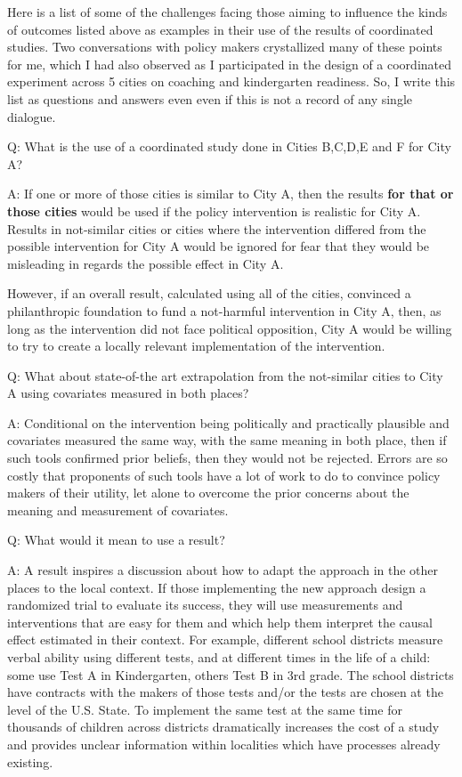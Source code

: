 \documentclass[
  11pt,
]{article}
\begin{document}
Here is a list of some of the challenges facing those aiming to
influence the kinds of outcomes listed above as examples in their use of
the results of coordinated studies. Two conversations with policy makers
crystallized many of these points for me, which I had also observed as I
participated in the design of a coordinated experiment across 5 cities
on coaching and kindergarten readiness. So, I write this list as
questions and answers even even if this is not a record of any single
dialogue.

Q: What is the use of a coordinated study done in Cities B,C,D,E and F
for City A?

A: If one or more of those cities is similar to City A, then the results
\textbf{for that or those cities} would be used if the policy
intervention is realistic for City A. Results in not-similar cities or
cities where the intervention differed from the possible intervention
for City A would be ignored for fear that they would be misleading in
regards the possible effect in City A.

However, if an overall result, calculated using all of the cities,
convinced a philanthropic foundation to fund a not-harmful intervention
in City A, then, as long as the intervention did not face political
opposition, City A would be willing to try to create a locally relevant
implementation of the intervention.

Q: What about state-of-the art extrapolation from the not-similar cities
to City A using covariates measured in both places?

A: Conditional on the intervention being politically and practically
plausible and covariates measured the same way, with the same meaning in
both place, then if such tools confirmed prior beliefs, then they would
not be rejected. Errors are so costly that proponents of such tools have
a lot of work to do to convince policy makers of their utility, let
alone to overcome the prior concerns about the meaning and measurement
of covariates.

Q: What would it mean to use a result?

A: A result inspires a discussion about how to adapt the approach in the
other places to the local context. If those implementing the new
approach design a randomized trial to evaluate its success, they will
use measurements and interventions that are easy for them and which help
them interpret the causal effect estimated in their context. For
example, different school districts measure verbal ability using
different tests, and at different times in the life of a child: some use
Test A in Kindergarten, others Test B in 3rd grade. The school districts
have contracts with the makers of those tests and/or the tests are
chosen at the level of the U.S. State. To implement the same test at the
same time for thousands of children across districts dramatically
increases the cost of a study and provides unclear information within
localities which have processes already existing.
\end{document}
